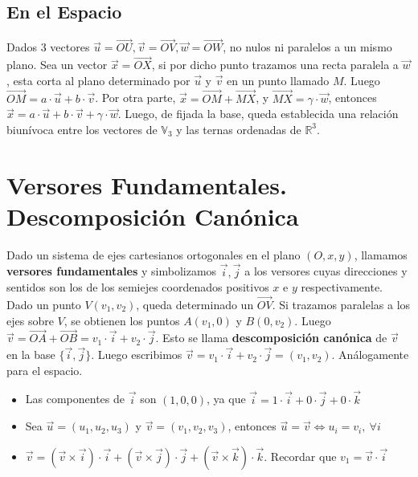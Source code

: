 \documentclass[11pt,a4paper]{article}
\begin{document}
\subsection{En el Espacio}
\noindent Dados 3 vectores $\overrightarrow{u} = \overrightarrow{OU}, \overrightarrow{v} = \overrightarrow{OV}, \overrightarrow{w} = \overrightarrow{OW}$, no nulos ni paralelos a un mismo plano. Sea un vector $\overrightarrow{x} = \overrightarrow{OX}$, si por dicho punto trazamos una recta paralela a $\overrightarrow{w}$, esta corta al plano determinado por $\overrightarrow{u}$ y $\overrightarrow{v}$ en un punto llamado $M$. Luego $\overrightarrow{OM} = a \cdot \overrightarrow{u} + b \cdot \overrightarrow{v}$. Por otra parte, $\overrightarrow{x} = \overrightarrow{OM} + \overrightarrow{MX}$, y $\overrightarrow{MX} = \gamma \cdot \overrightarrow{w}$, entonces $\overrightarrow{x} = a\cdot \overrightarrow{u} + b \cdot \overrightarrow{v} + \gamma \cdot \overrightarrow{w}$. Luego, de fijada la base, queda establecida una relaci\'on biun\'ivoca entre los vectores de $\mathbb{V}_3$ y las ternas ordenadas de $\mathbb{R}^3$.

\section{Versores Fundamentales. Descomposici\'on Can\'onica}
\noindent Dado un sistema de ejes cartesianos ortogonales en el plano $(O,x,y)$, llamamos \textbf{versores fundamentales} y simbolizamos $\overrightarrow{i}, \overrightarrow{j}$ a los versores cuyas direcciones y sentidos son los de los semiejes coordenados positivos $x$ e $y$ respectivamente. Dado un punto $V(v_1, v_2)$, queda determinado un $\overrightarrow{OV}$. Si trazamos paralelas a los ejes sobre $V$, se obtienen los puntos $A(v_1, 0)$ y $B(0,v_2)$. Luego $\overrightarrow{v}=\overrightarrow{OA} + \overrightarrow{OB} = v_1 \cdot \overrightarrow{i} + v_2 \cdot \overrightarrow{j}$. Esto se llama \textbf{descomposici\'on can\'onica} de $\overrightarrow{v}$ en la base $\{\overrightarrow{i}, \overrightarrow{j}\}$. Luego escribimos $\overrightarrow{v} = v_1 \cdot \overrightarrow{i} + v_2 \cdot \overrightarrow{j} = (v_1, v_2)$. An\'alogamente para el espacio.
\begin{itemize}
\item Las componentes de $\overrightarrow{i}$ son $(1,0,0)$, ya que $\overrightarrow{i} = 1 \cdot \overrightarrow{i} + 0 \cdot \overrightarrow{j} + 0 \cdot \overrightarrow{k}$
\item Sea $\overrightarrow{u} = (u_1,u_2,u_3)$ y $\overrightarrow{v}=(v_1,v_2,v_3)$, entonces $\overrightarrow{u} = \overrightarrow{v} \iff u_i = v_i,\ \forall i$
\item $\overrightarrow{v} = (\overrightarrow{v}\times\overrightarrow{i}) \cdot \overrightarrow{i} + (\overrightarrow{v}\times\overrightarrow{j})\cdot\overrightarrow{j} + (\overrightarrow{v}\times\overrightarrow{k})\cdot \overrightarrow{k}$. Recordar que $v_1 = \overrightarrow{v} \cdot \overrightarrow{i}$
\end{itemize}
\end{document}
